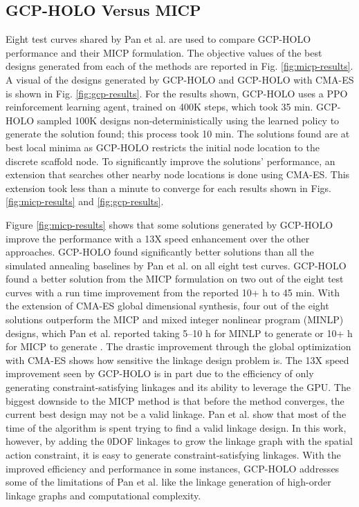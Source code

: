 \subsection{GCP-HOLO Versus MICP}\label{sec:gcp:results:micp}
Eight test curves shared by Pan et al. \cite{pan_joint_2022} are used to compare GCP-HOLO performance and their MICP formulation. The objective values of the best designs generated from each of the methods are reported in Fig. \ref{fig:micp-results}. A visual of the designs generated by GCP-HOLO and GCP-HOLO with CMA-ES is shown in Fig. \ref{fig:gcp-results}. For the results shown, GCP-HOLO uses a PPO reinforcement learning agent, trained on 400K steps, which took 35 min. GCP-HOLO sampled 100K designs non-deterministically using the learned policy to generate the solution found; this process took 10 min. The solutions found are at best local minima as GCP-HOLO restricts the initial node location to the discrete scaffold node. To significantly improve the solutions’ performance, an extension that searches other nearby node locations is done using CMA-ES. This extension took less than a minute to converge for each results shown in Figs. \ref{fig:micp-results} and \ref{fig:gcp-results}. 

Figure \ref{fig:micp-results} shows that some solutions generated by GCP-HOLO improve the performance with a 13X speed enhancement over the other approaches. GCP-HOLO found significantly better solutions than all the simulated annealing baselines by Pan et al. on all eight test curves. GCP-HOLO found a better solution from the MICP formulation on two out of the eight test curves with a run time improvement from the reported 10+ h to 45 min. With the extension of CMA-ES global dimensional synthesis, four out of the eight solutions outperform the MICP and mixed integer nonlinear program (MINLP) designs, which Pan et al. reported taking 5–10 h for MINLP to generate or 10+ h for MICP to generate \cite{pan_joint_2022}. The drastic improvement through the global optimization with CMA-ES shows how sensitive the linkage design problem is. The 13X speed improvement seen by GCP-HOLO is in part due to the efficiency of only generating constraint-satisfying linkages and its ability to leverage the GPU. The biggest downside to the MICP method is that before the method converges, the current best design may not be a valid linkage. Pan et al. \cite{pan_joint_2022} show that most of the time of the algorithm is spent trying to find a valid linkage design. In this work, however, by adding the 0DOF linkages to grow the linkage graph with the spatial action constraint, it is easy to generate constraint-satisfying linkages. With the improved efficiency and performance in some instances, GCP-HOLO addresses some of the limitations of Pan et al. \cite{pan_joint_2022} like the linkage generation of high-order linkage graphs and computational complexity.

